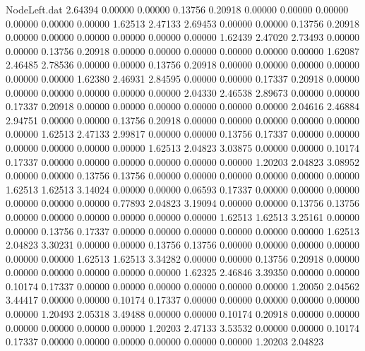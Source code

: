 \begin{filecontents}{NodeLeft.dat}
   2.64394    0.00000    0.00000     0.13756    0.20918    0.00000    0.00000    0.00000    0.00000    0.00000    0.00000    1.62513    2.47133
   2.69453    0.00000    0.00000     0.13756    0.20918    0.00000    0.00000    0.00000    0.00000    0.00000    0.00000    1.62439    2.47020
   2.73493    0.00000    0.00000     0.13756    0.20918    0.00000    0.00000    0.00000    0.00000    0.00000    0.00000    1.62087    2.46485
   2.78536    0.00000    0.00000     0.13756    0.20918    0.00000    0.00000    0.00000    0.00000    0.00000    0.00000    1.62380    2.46931
   2.84595    0.00000    0.00000     0.17337    0.20918    0.00000    0.00000    0.00000    0.00000    0.00000    0.00000    2.04330    2.46538
   2.89673    0.00000    0.00000     0.17337    0.20918    0.00000    0.00000    0.00000    0.00000    0.00000    0.00000    2.04616    2.46884
   2.94751    0.00000    0.00000     0.13756    0.20918    0.00000    0.00000    0.00000    0.00000    0.00000    0.00000    1.62513    2.47133
   2.99817    0.00000    0.00000     0.13756    0.17337    0.00000    0.00000    0.00000    0.00000    0.00000    0.00000    1.62513    2.04823
   3.03875    0.00000    0.00000     0.10174    0.17337    0.00000    0.00000    0.00000    0.00000    0.00000    0.00000    1.20203    2.04823
   3.08952    0.00000    0.00000     0.13756    0.13756    0.00000    0.00000    0.00000    0.00000    0.00000    0.00000    1.62513    1.62513
   3.14024    0.00000    0.00000     0.06593    0.17337    0.00000    0.00000    0.00000    0.00000    0.00000    0.00000    0.77893    2.04823
   3.19094    0.00000    0.00000     0.13756    0.13756    0.00000    0.00000    0.00000    0.00000    0.00000    0.00000    1.62513    1.62513
   3.25161    0.00000    0.00000     0.13756    0.17337    0.00000    0.00000    0.00000    0.00000    0.00000    0.00000    1.62513    2.04823
   3.30231    0.00000    0.00000     0.13756    0.13756    0.00000    0.00000    0.00000    0.00000    0.00000    0.00000    1.62513    1.62513
   3.34282    0.00000    0.00000     0.13756    0.20918    0.00000    0.00000    0.00000    0.00000    0.00000    0.00000    1.62325    2.46846
   3.39350    0.00000    0.00000     0.10174    0.17337    0.00000    0.00000    0.00000    0.00000    0.00000    0.00000    1.20050    2.04562
   3.44417    0.00000    0.00000     0.10174    0.17337    0.00000    0.00000    0.00000    0.00000    0.00000    0.00000    1.20493    2.05318
   3.49488    0.00000    0.00000     0.10174    0.20918    0.00000    0.00000    0.00000    0.00000    0.00000    0.00000    1.20203    2.47133
   3.53532    0.00000    0.00000     0.10174    0.17337    0.00000    0.00000    0.00000    0.00000    0.00000    0.00000    1.20203    2.04823

\end{filecontents}
